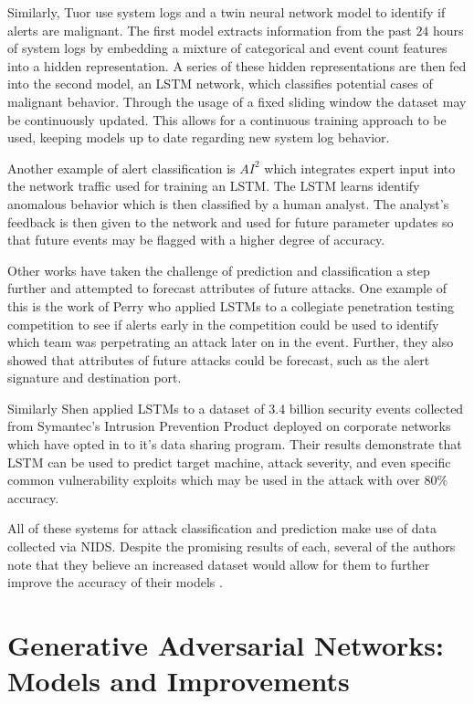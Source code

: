Similarly, Tuor \etal \cite{Tuor} use system logs and a twin neural network model to identify if alerts are malignant. The first model extracts information from the past $24$ hours of system logs by embedding a mixture of categorical and event count features into a hidden representation. A series of these hidden representations are then fed into the second model, an LSTM network, which classifies potential cases of malignant behavior. Through the usage of a fixed sliding window the dataset may be continuously updated. This allows for a continuous training approach to be used, keeping models up to date regarding new system log behavior. 

Another example of alert classification is $AI^2$ \cite{Veeramachaneni2016} which integrates expert input into the network traffic used for training an LSTM. The LSTM learns identify anomalous behavior which is then classified by a human analyst. The analyst's feedback is then given to the network and used for future parameter updates so that future events may be flagged with a higher degree of accuracy.

Other works have taken the challenge of prediction and classification a step further and attempted to forecast attributes of future attacks. One example of this is the work of Perry \etal \cite{us} who applied LSTMs to a collegiate penetration testing competition to see if alerts early in the competition could be used to identify which team was perpetrating an attack later on in the event. Further, they also showed that attributes of future attacks could be forecast, such as the alert signature and destination port. 

Similarly Shen \etal \cite{Shen2018} applied LSTMs to a dataset of 3.4 billion security events collected from Symantec's Intrusion Prevention Product deployed on corporate networks which have opted in to it's data sharing program. Their results demonstrate that LSTM can be used to predict target machine, attack severity, and even specific common vulnerability exploits which may be used in the attack with over $80\%$ accuracy. 

All of these systems for attack classification and prediction make use of data collected via NIDS. Despite the promising results of each, several of the authors note that they believe an increased dataset would allow for them to further improve the accuracy of their models \cite{us, Faber2018, Shen2018}. 

\section{Generative Adversarial Networks: Models and Improvements}

